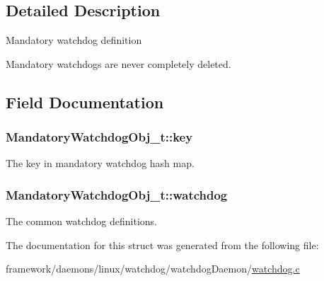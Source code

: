 \subsection{Detailed Description}
Mandatory watchdog definition

Mandatory watchdogs are never completely deleted. 

\subsection{Field Documentation}
\subsubsection[{\texorpdfstring{key}{key}}]{ Mandatory\+Watchdog\+Obj\+\_\+t\+::key}\hypertarget{struct_mandatory_watchdog_obj__t_a20ce97540d922e2df34c45e8d2b01255}{}\label{struct_mandatory_watchdog_obj__t_a20ce97540d922e2df34c45e8d2b01255}


The key in mandatory watchdog hash map. 

\subsubsection[{\texorpdfstring{watchdog}{watchdog}}]{ Mandatory\+Watchdog\+Obj\+\_\+t\+::watchdog}\hypertarget{struct_mandatory_watchdog_obj__t_a3362da802fcff3348e3b47d15823c2be}{}\label{struct_mandatory_watchdog_obj__t_a3362da802fcff3348e3b47d15823c2be}


The common watchdog definitions. 



The documentation for this struct was generated from the following file\+:\begin{DoxyCompactItemize}
\item 
framework/daemons/linux/watchdog/watchdog\+Daemon/\hyperlink{watchdog_8c}{watchdog.\+c}\end{DoxyCompactItemize}
